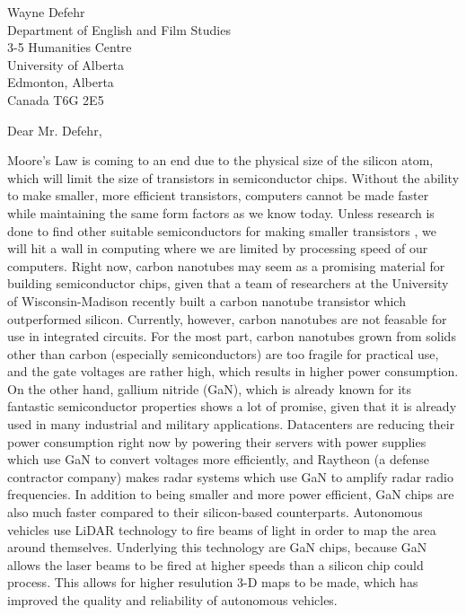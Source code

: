 \documentclass[letterpaper]{letter}
\begin{document}
\begin{letter}
{
Wayne Defehr\\
Department of English and Film Studies\\
3-5 Humanities Centre\\
University of Alberta\\
Edmonton, Alberta\\
Canada T6G 2E5\\
}

\opening{Dear Mr. Defehr,}
\doublespacing

Moore's Law is coming to an end due to the physical size of the silicon atom,
which will limit the size of transistors in semiconductor chips. Without the
ability to make smaller, more efficient transistors, computers cannot be made
faster while maintaining the same form factors as we know today. Unless research
is done to find other suitable semiconductors for making smaller transistors ,
we will hit a wall in computing where we are limited by processing speed of our
computers. Right now, carbon nanotubes may seem as a promising material for
building semiconductor chips, given that a team of researchers at the University
of Wisconsin-Madison recently built a carbon nanotube transistor which
outperformed silicon. Currently, however, carbon nanotubes
are not feasable for use in integrated circuits. For the most part, carbon
nanotubes grown from solids other than carbon (especially semiconductors) are
too fragile for practical use, and the gate voltages are rather high, which
results in higher power consumption. On the other hand, gallium nitride (GaN),
which is already known for its fantastic semiconductor properties shows a lot of
promise, given that it is already used in many industrial and military
applications. Datacenters are reducing their power consumption right now by
powering their servers with power supplies which use GaN to convert voltages
more efficiently, and Raytheon (a defense contractor company) makes radar
systems which use GaN to amplify radar radio frequencies. In addition to being
smaller and more power efficient, GaN chips are also much faster compared to
their silicon-based counterparts. Autonomous vehicles use LiDAR technology to
fire beams of light in order to map the area around themselves. Underlying this
technology are GaN chips, because GaN allows the laser beams to be fired at
higher speeds than a silicon chip could process. This allows for higher
resulution 3-D maps to be made, which has improved the quality and reliability of autonomous
vehicles.





\end{letter}
\end{document}
